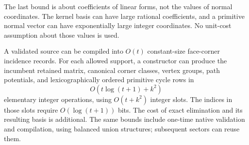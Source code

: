 The last bound is about coefficients of linear forms, not the values
of normal coordinates.  The kernel basis can have large rational
coefficients, and a primitive normal vector can have exponentially
large integer coordinates.  No unit-cost assumption about those
values is used.

\begin{theorem}
\label{sp:constructor}
A validated source can be compiled into \(O(t)\) constant-size
face-corner incidence records.  For each allowed support, a constructor
can produce the incumbent retained matrix, canonical corner classes,
vertex groups, path potentials, and lexicographically ordered primitive
cycle rows in
\[
 O(t\log(t+1)+k^2)
\]
elementary integer operations, using \(O(t+k^2)\) integer slots.
The indices in those slots require \(O(\log(t+1))\) bits.
The cost of exact elimination and its resulting basis is additional.
The same bounds include one-time native validation and compilation,
using balanced union structures; subsequent sectors can reuse them.
\end{theorem}
